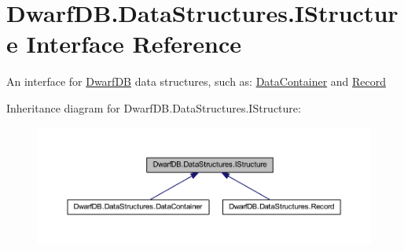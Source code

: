 \hypertarget{interface_dwarf_d_b_1_1_data_structures_1_1_i_structure}{\section{Dwarf\+D\+B.\+Data\+Structures.\+I\+Structure Interface Reference}
\label{interface_dwarf_d_b_1_1_data_structures_1_1_i_structure}
}


An interface for \hyperlink{namespace_dwarf_d_b}{Dwarf\+D\+B} data structures, such as\+: \hyperlink{class_dwarf_d_b_1_1_data_structures_1_1_data_container}{Data\+Container} and \hyperlink{class_dwarf_d_b_1_1_data_structures_1_1_record}{Record}  




Inheritance diagram for Dwarf\+D\+B.\+Data\+Structures.\+I\+Structure\+:\nopagebreak
\begin{figure}[H]
\begin{center}
\leavevmode
\includegraphics[width=350pt]{interface_dwarf_d_b_1_1_data_structures_1_1_i_structure__inherit__graph}
\end{center}
\end{figure}
